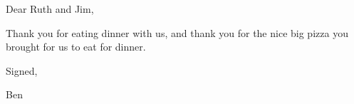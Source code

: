 \documentclass[12pt]{article}
\begin{document}
\Large
Dear Ruth and Jim,

Thank you for eating dinner with us, and thank you for the nice big pizza you brought for us to eat for dinner.

Signed,

\vspace{3\baselineskip}
Ben
\end{document}
